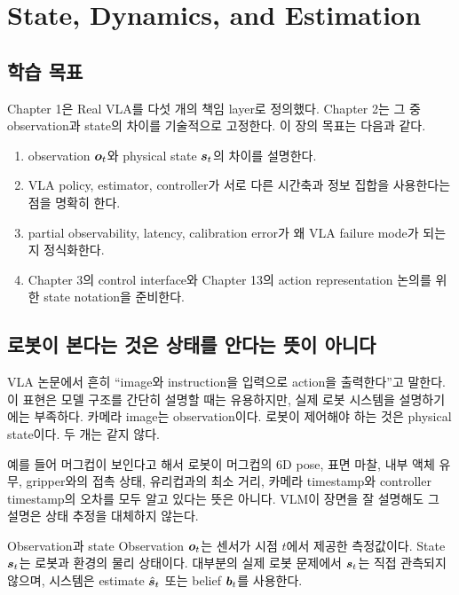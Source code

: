 \chapter{State, Dynamics, and Estimation}

\section*{학습 목표}
Chapter 1은 Real VLA를 다섯 개의 책임 layer로 정의했다. Chapter 2는 그 중 observation과 state의 차이를 기술적으로 고정한다. 이 장의 목표는 다음과 같다.

\begin{enumerate}
  \item observation $\bm{o}_t$와 physical state $\bm{s}_t$의 차이를 설명한다.
  \item VLA policy, estimator, controller가 서로 다른 시간축과 정보 집합을 사용한다는 점을 명확히 한다.
  \item partial observability, latency, calibration error가 왜 VLA failure mode가 되는지 정식화한다.
  \item Chapter 3의 control interface와 Chapter 13의 action representation 논의를 위한 state notation을 준비한다.
\end{enumerate}

\section{로봇이 본다는 것은 상태를 안다는 뜻이 아니다}

VLA 논문에서 흔히 ``image와 instruction을 입력으로 action을 출력한다''고 말한다. 이 표현은 모델 구조를 간단히 설명할 때는 유용하지만, 실제 로봇 시스템을 설명하기에는 부족하다. 카메라 image는 observation이다. 로봇이 제어해야 하는 것은 physical state이다. 두 개는 같지 않다.

예를 들어 머그컵이 보인다고 해서 로봇이 머그컵의 6D pose, 표면 마찰, 내부 액체 유무, gripper와의 접촉 상태, 유리컵과의 최소 거리, 카메라 timestamp와 controller timestamp의 오차를 모두 알고 있다는 뜻은 아니다. VLM이 장면을 잘 설명해도 그 설명은 상태 추정을 대체하지 않는다.

\begin{definitionbox}{Observation과 state}
Observation $\bm{o}_t$는 센서가 시점 $t$에서 제공한 측정값이다. State $\bm{s}_t$는 로봇과 환경의 물리 상태이다. 대부분의 실제 로봇 문제에서 $\bm{s}_t$는 직접 관측되지 않으며, 시스템은 estimate $\hat{\bm{s}}_t$ 또는 belief $\bm{b}_t$를 사용한다.
\end{definitionbox}

